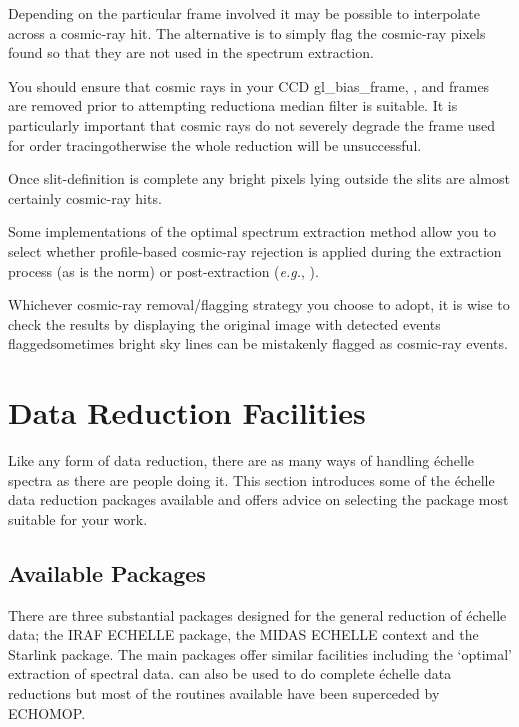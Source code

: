 Depending on the particular frame involved it may be possible to
interpolate across a cosmic-ray hit.  The alternative is to simply flag
the cosmic-ray pixels found so that they are not used in the spectrum
extraction.

You should ensure that cosmic rays in your CCD 
{gl_bias_frame}, , and
 frames are removed prior to
attempting reduction\sgspec{---}{ - }a median filter is suitable.  It is
particularly important that cosmic rays do not severely degrade the
frame used for order tracing\sgspec{---}{ - }otherwise the whole
reduction will be unsuccessful.

Once slit-definition is complete any bright pixels lying outside the
slits are almost certainly cosmic-ray hits.

Some implementations of the optimal spectrum extraction method allow you
to select whether profile-based cosmic-ray rejection is applied
during the extraction process (as is the norm) or post-extraction
({\em{e.g.}}, )\@.

Whichever cosmic-ray removal/flagging strategy you choose to adopt, it
is wise to check the results by displaying the original image with
detected events flagged\sgspec{---}{ - }sometimes bright sky lines can be
mistakenly flagged as cosmic-ray events.


\section{\label{se_facilities}Data
         Reduction Facilities }

Like any form of data reduction, there are as many ways of handling
\'{e}chelle spectra as there are people doing it.
This section introduces some of the \'{e}chelle data reduction packages
available and offers advice on selecting the package most suitable for
your work.


\subsection{\label{se_packages}Available Packages}

There are three substantial packages designed for the general
reduction of \'{e}chelle data; the IRAF ECHELLE package, the MIDAS
ECHELLE context and the Starlink  package.
The main packages offer similar facilities including the `optimal'
extraction of spectral data.
 can also be used to do complete \'{e}chelle
data reductions but most of the routines available have been superceded
by ECHOMOP.

